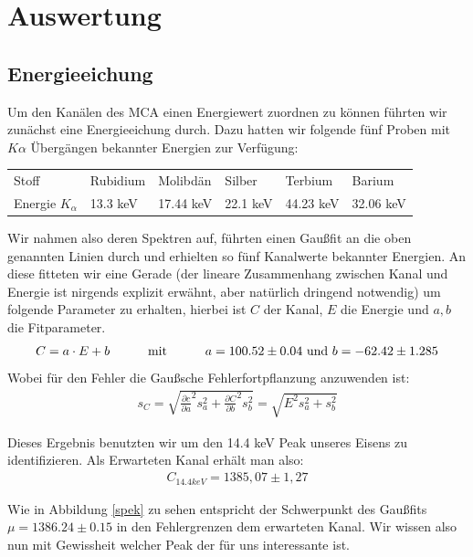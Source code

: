 \documentclass[12pt]{article}
\begin{document}
\section{Auswertung}
\subsection{Energieeichung}

Um den Kanälen des MCA einen Energiewert zuordnen zu können führten wir zunächst eine Energieeichung durch. Dazu hatten wir folgende fünf Proben mit $K\alpha$ Übergängen
bekannter Energien zur Verfügung:

\begin{center}
\begin{tabular}{|l|l|l|l|l|l|}
\hline
Stoff & Rubidium & Molibdän & Silber & Terbium & Barium\\
Energie $K_{\alpha}$ & 13.3 keV & 17.44 keV & 22.1 keV & 44.23 keV & 32.06 keV
\hline
\end{tabular}
\end{center}
Wir nahmen also deren Spektren auf, führten einen Gaußfit an die oben genannten Linien durch und erhielten so fünf Kanalwerte bekannter Energien. An diese fitteten 
wir eine Gerade (der lineare Zusammenhang zwischen Kanal und Energie ist nirgends explizit erwähnt, aber natürlich dringend notwendig) um folgende Parameter
zu erhalten, hierbei ist $C$ der Kanal, $E$ die Energie und $a,b$ die Fitparameter.
\begin{align*}
  C = a \cdot E + b \hspace{30pt} \textnormal{mit}\hspace{30pt}a = 100.52 \pm 0.04\textnormal{ und }b =  -62.42 \pm 1.285
\end{align*}
Wobei für den Fehler die Gaußsche Fehlerfortpflanzung anzuwenden ist:
\begin{align*}
  s_C = \sqrt{\frac{\partial{c}}{\partial{a}}^2 s_a^2 + \frac{\partial{C}}{\partial{b}}^2 s_b^2 } = \sqrt{E^2 s_a^2 + s_b^2}
\end{align*}

Dieses Ergebnis benutzten wir um den 14.4 keV Peak unseres Eisens zu identifizieren. Als Erwarteten Kanal erhält man also:
\begin{align*}
  C_{14.4keV} = 1385,07 \pm 1,27
\end{align*}

Wie in Abbildung \ref{spek} zu sehen entspricht der Schwerpunkt des Gaußfits $\mu=1386.24\pm0.15$ in den Fehlergrenzen dem erwarteten Kanal. Wir wissen also nun mit Gewissheit
welcher Peak der für uns interessante ist.
\end{document}

